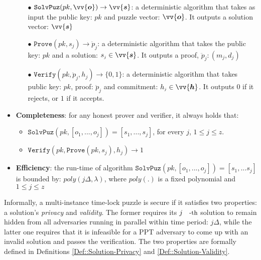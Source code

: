 \begin{definition}
\begin{itemize}[leftmargin=.43cm]
\begin{itemize}
\item[$\bullet$]$\mathtt {SolvPuz}(pk,\vv{\bm{o}})\rightarrow \vv{\bm{s}}$:   a deterministic algorithm that takes as input  the public key: $pk$ and  puzzle vector: $\vv{\bm{o}}$. It outputs a solution vector: $\vv{\bm{s}}$

\item[$\bullet$]$\mathtt {Prove}(pk,s_{\scriptscriptstyle j})\rightarrow \ddot{p}_{\scriptscriptstyle j}$:  a deterministic algorithm that takes the public key: $pk$ and a solution: $s_{\scriptscriptstyle j}\in\vv{\bm{s}}$. It outputs a proof, $\ddot{p}_{\scriptscriptstyle j}:(m_{\scriptscriptstyle j},d_{\scriptscriptstyle j})$
\item[$\bullet$]$\mathtt {Verify}(pk,\ddot{p}_{\scriptscriptstyle j},h_{\scriptscriptstyle j})\rightarrow \{0,1\}$:  a deterministic algorithm that takes  public key: $pk$,  proof: $\ddot{p}_{\scriptscriptstyle j}$ and commitment: $h_{\scriptscriptstyle j}\in \vv{\bm{h}}$. It outputs  $0$ if it rejects, or $1$ if it accepts. 
\end{itemize}



\item \textbf{Completeness}: for any honest prover and verifier, it always holds that: 
\begin{itemize}
\item$\mathtt{SolvPuz}(pk,[o_{\scriptscriptstyle 1},...,o_{\scriptscriptstyle j}])=[s_{\scriptscriptstyle1},...,s_{\scriptscriptstyle j}]$, for every $j$, $1\leq j\leq z$. 

\item $\mathtt {Verify}(pk,\mathtt {Prove}(pk,s_{\scriptscriptstyle j}),h_{\scriptscriptstyle j})\rightarrow 1$
\end{itemize}



\item \textbf{Efficiency}: the run-time of algorithm $\mathtt {SolvPuz}(pk,[o_{\scriptscriptstyle 1},...,o_{\scriptscriptstyle j}])=[s_{\scriptscriptstyle1},...s_{\scriptscriptstyle j}]$ is bounded by:  $ poly(j\Delta,\lambda)$, where $poly(.)$ is a fixed polynomial and  $1\leq j\leq z$
\end{itemize}
\end{definition}
 
Informally, a multi-instance time-lock puzzle is secure if it satisfies two properties:  a solution's \emph{privacy} and  \emph{validity}. The former  requires  its $j\text{\small{-th}}$ solution   to remain hidden from all adversaries running in parallel within  time period: $j \Delta$, while the latter one requires that it is  infeasible for  a PPT adversary to come up with an invalid solution  and passes the verification. The two properties are formally defined in Definitions \ref{Def::Solution-Privacy} and \ref{Def::Solution-Validity}.
 

